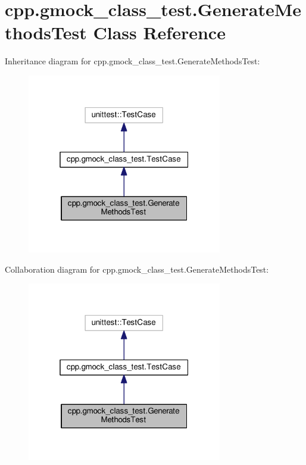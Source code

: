 \hypertarget{classcpp_1_1gmock__class__test_1_1GenerateMethodsTest}{}\section{cpp.\+gmock\+\_\+class\+\_\+test.\+Generate\+Methods\+Test Class Reference}
\label{classcpp_1_1gmock__class__test_1_1GenerateMethodsTest}


Inheritance diagram for cpp.\+gmock\+\_\+class\+\_\+test.\+Generate\+Methods\+Test\+:\nopagebreak
\begin{figure}[H]
\begin{center}
\leavevmode
\includegraphics[width=241pt]{classcpp_1_1gmock__class__test_1_1GenerateMethodsTest__inherit__graph}
\end{center}
\end{figure}


Collaboration diagram for cpp.\+gmock\+\_\+class\+\_\+test.\+Generate\+Methods\+Test\+:\nopagebreak
\begin{figure}[H]
\begin{center}
\leavevmode
\includegraphics[width=241pt]{classcpp_1_1gmock__class__test_1_1GenerateMethodsTest__coll__graph}
\end{center}
\end{figure}
